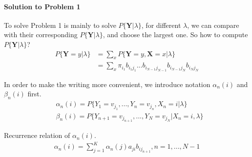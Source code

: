 \documentclass[runningheads]{llncs}
\begin{document}
\paragraph{Solution to Problem 1}
To solve Problem 1 is mainly to solve $P \{ \mathbf{Y} | \lambda \} $,
for different $\lambda$, we can compare with their corresponding
$P \{ \mathbf{Y} | \lambda \} $, and choose the largest one.
So how to compute $P \{ \mathbf{Y} | \lambda \} $?
\begin{align}
    P \{ \mathbf{Y} = y | \lambda \}
    &= \sum_x P \{ \mathbf{Y} = y, \mathbf{X} = x | \lambda \} \\
    &= \sum_x \pi_{i_1} b_{i_1 j_1}... b_{i_{N-1} j_{N-1}} b_{i_{N-1} j_{N}} b_{i_{N} j_{N}}
\end{align}
\par
In order to make the writing more convenient, we introduce notation
$\alpha_n(i)$ and $\beta_n(i)$ first.
\begin{align}
    &\alpha_n(i) = P \{ Y_1 = v_{j_1},..., Y_n = v_{j_n}, X_n = i | \lambda \} \\
    &\beta_n(i) = P \{ Y_{n+1} = v_{j_{n+1}},...,Y_N = v_{j_N} | X_n = i, \lambda \}
\end{align}
\par
Recurrence relation of $\alpha_n(i)$.
\begin{align}
    \alpha_n(i) = \sum_{j=1}^K \alpha_n(j) a_{ji} b_{ij_{n+1}}, n = 1,..., N - 1
\end{align}
\end{document}
